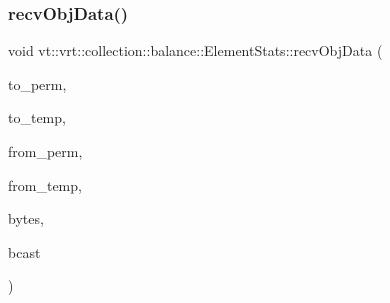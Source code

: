 \mbox{\label{structvt_1_1vrt_1_1collection_1_1balance_1_1_element_stats_afdd59d341ddd577a4652027b132a7c06}} 
\subsubsection{\texorpdfstring{recv\+Obj\+Data()}{recvObjData()}}
{\footnotesize\ttfamily void vt\+::vrt\+::collection\+::balance\+::\+Element\+Stats\+::recv\+Obj\+Data (\begin{DoxyParamCaption}\item[{\hyperlink{namespacevt_1_1vrt_1_1collection_1_1balance_a14c8d2c972f2913aa3f1636e5be0a120}{Element\+I\+D\+Type}}]{to\+\_\+perm,  }\item[{\hyperlink{namespacevt_1_1vrt_1_1collection_1_1balance_a14c8d2c972f2913aa3f1636e5be0a120}{Element\+I\+D\+Type}}]{to\+\_\+temp,  }\item[{\hyperlink{namespacevt_1_1vrt_1_1collection_1_1balance_a14c8d2c972f2913aa3f1636e5be0a120}{Element\+I\+D\+Type}}]{from\+\_\+perm,  }\item[{\hyperlink{namespacevt_1_1vrt_1_1collection_1_1balance_a14c8d2c972f2913aa3f1636e5be0a120}{Element\+I\+D\+Type}}]{from\+\_\+temp,  }\item[{double}]{bytes,  }\item[{bool}]{bcast }\end{DoxyParamCaption})}

\mbox{\label{structvt_1_1vrt_1_1collection_1_1balance_1_1_element_stats_aa7eb11ba5b2787b129925d9f2cd0ac89}} 
